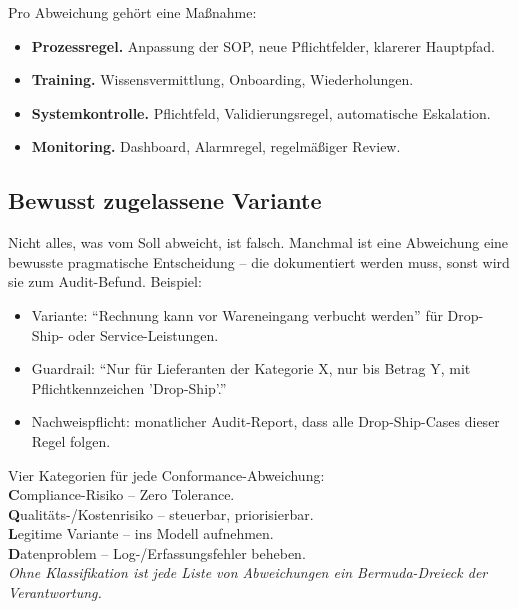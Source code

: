 \documentclass[11pt,a4paper,oneside]{article}
\newcommand{\caveatfontfallback}{\itshape}
\newcommand\caveatfont{\caveatfontfallback}%
\newcommand{\akzent}[1]{{\caveatfont\color{lpAmber}#1}}
\newcommand{\fachbegriff}[1]{\textbf{#1}}
\begin{document}
Pro Abweichung gehört eine Maßnahme:

\begin{itemize}
  \item \fachbegriff{Prozessregel.} Anpassung der SOP, neue Pflichtfelder, klarerer Hauptpfad.
  \item \fachbegriff{Training.} Wissensvermittlung, Onboarding, Wiederholungen.
  \item \fachbegriff{Systemkontrolle.} Pflichtfeld, Validierungsregel, automatische Eskalation.
  \item \fachbegriff{Monitoring.} Dashboard, Alarmregel, regelmäßiger Review.
\end{itemize}

\subsection{Bewusst zugelassene Variante}

Nicht alles, was vom Soll abweicht, ist falsch. Manchmal ist eine Abweichung eine bewusste pragmatische Entscheidung -- die dokumentiert werden muss, sonst wird sie zum Audit-Befund. Beispiel:

\begin{itemize}
  \item Variante: ``Rechnung kann vor Wareneingang verbucht werden'' für Drop-Ship- oder Service-Leistungen.
  \item Guardrail: ``Nur für Lieferanten der Kategorie X, nur bis Betrag Y, mit Pflichtkennzeichen 'Drop-Ship'.''
  \item Nachweispflicht: monatlicher Audit-Report, dass alle Drop-Ship-Cases dieser Regel folgen.
\end{itemize}

\begin{eselsbox}[Eselsbrücke: \akzent{C-Q-L-D}]
Vier Kategorien für jede Conformance-Abweichung:\\[2pt]
\textbf{C}ompliance-Risiko -- Zero Tolerance.\\
\textbf{Q}ualitäts-/Kostenrisiko -- steuerbar, priorisierbar.\\
\textbf{L}egitime Variante -- ins Modell aufnehmen.\\
\textbf{D}atenproblem -- Log-/Erfassungsfehler beheben.\\[2pt]
\emph{Ohne Klassifikation ist jede Liste von Abweichungen ein Bermuda-Dreieck der Verantwortung.}
\end{eselsbox}

\end{document}
